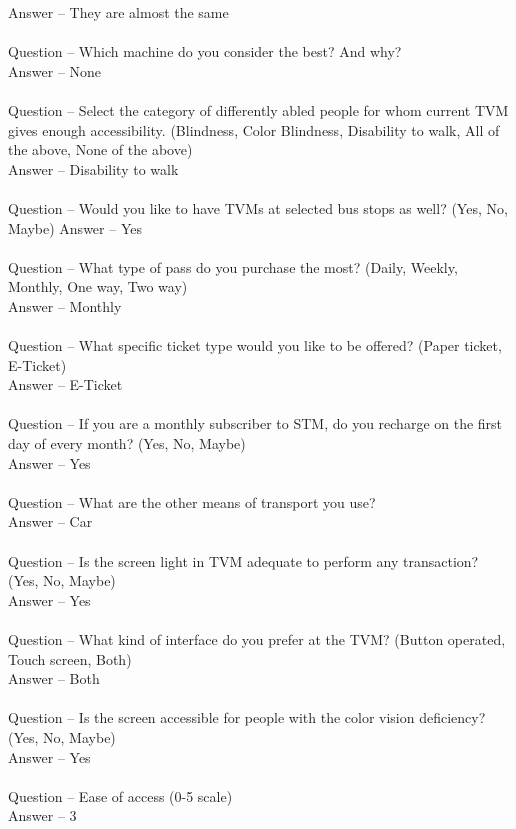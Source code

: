 \documentclass[a4paper, 11pt]{report}
\begin{document}
{Answer – They are almost the same\\\\
Question – Which machine do you consider the best? And why?\\
Answer – None\\\\
Question – Select the category of differently abled people for whom current TVM gives enough accessibility. (Blindness, Color Blindness, Disability to walk, All of the above, None of the above)\\
Answer – Disability to walk\\\\
Question – Would you like to have TVMs at selected bus stops as well? (Yes, No, Maybe)
Answer – Yes\\\\
Question – What type of pass do you purchase the most? (Daily, Weekly, Monthly, One way, Two way)\\
Answer – Monthly\\\\
Question – What specific ticket type would you like to be offered? (Paper ticket, E-Ticket)\\
Answer – E-Ticket\\\\
Question – If you are a monthly subscriber to STM, do you recharge on the first day of every month? (Yes, No, Maybe)\\
Answer – Yes\\\\
Question – What are the other means of transport you use? \\ 
Answer – Car\\\\
Question – Is the screen light in TVM adequate to perform any transaction? (Yes, No, Maybe)\\
Answer – Yes\\\\
Question – What kind of interface do you prefer at the TVM? (Button operated, Touch screen, Both)\\
Answer – Both\\\\
Question – Is the screen accessible for people with the color vision deficiency? (Yes, No, Maybe)\\
Answer – Yes\\\\
Question – Ease of access (0-5 scale)\\
Answer – 3\\\\
}
\end{document}
